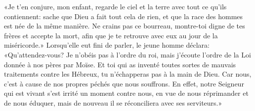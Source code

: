 «Je t’en conjure, mon enfant, regarde le ciel et la terre avec tout ce qu’ils contiennent:
	sache que Dieu a fait tout cela de rien,
	et que la race des hommes est née de la même manière.
Ne crains pas ce bourreau, montre-toi digne de tes frères et accepte la mort,
	afin que je te retrouve avec eux au jour de la miséricorde.»
Lorsqu’elle eut fini de parler, le jeune homme déclara:
	«Qu’attendez-vous?
	Je n’obéis pas à l’ordre du roi,
	mais j’écoute l’ordre de la Loi donnée à nos pères par Moïse.
Et toi qui as inventé toutes sortes de mauvais traitements contre les Hébreux,
	tu n’échapperas pas à la main de Dieu.
Car nous, c’est à cause de nos propres péchés que nous souffrons.
En effet, notre Seigneur qui est vivant s’est irrité un moment contre nous,
	en vue de nous réprimander et de nous éduquer,
	mais de nouveau il se réconciliera avec ses serviteurs.»
